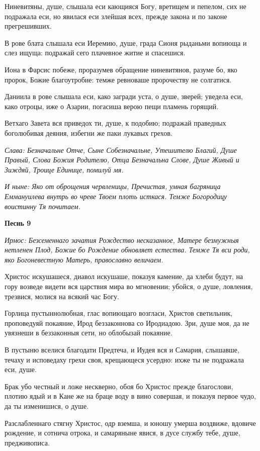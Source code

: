 Ниневитяны, душе, слышала еси кающияся Богу, вретищем и пепелом, сих не подражала еси, но явилася еси злейшая всех, прежде закона и по законе прегрешивших. 

В рове блата слышала еси Иеремию, душе, града Сионя рыданьми вопиюща и слез ищуща: подражай сего плачевное житие и спасешися. 

Иона в Фарсис побеже, проразумев обращение ниневитянов, разуме бо, яко пророк, Божие благоутробие: темже ревноваше пророчеству не солгатися. 

Даниила в рове слышала еси, како загради уста, о душе, зверей; уведела еси, како отроцы, иже о Азарии, погасиша верою пещи пламень горящий. 

Ветхаго Завета вся приведох ти, душе, к подобию; подражай праведных боголюбивая деяния, избегни же паки лукавых грехов. 

\itshape Слава\normalfont{}: Безначальне Отче, Сыне Собезначальне, Утешителю Благий, Душе Правый, Слова Божия Родителю, Отца Безначальна Слове, Душе Живый и Зиждяй, Троице Единице, помилуй мя. 

\itshape И ныне\normalfont{}: Яко от оброщения червленицы, Пречистая, умная багряница Еммануилева внутрь во чреве Твоем плоть исткася. Темже Богородицу воистинну Тя почитаем. 

\medskip\bfseries Песнь 9\normalfont{}

\itshape Ирмос\normalfont{}: Безсеменнаго зачатия Рождество несказанное, Матере безмужныя нетленен Плод, Божие бо Рождение обновляет естества. Темже Тя вси роди, яко Богоневестную Матерь, православно величаем. 

Христос искушашеся, диавол искушаше, показуя камение, да хлеби будут, на гору возведе видети вся царствия мира во мгновении; убойся, о душе, ловления, трезвися, молися на всякий час Богу. 

Горлица пустыннолюбная, глас вопиющаго возгласи, Христов светильник, проповедуяй покаяние, Ирод беззаконнова со Иродиадою. Зри, душе моя, да не увязнеши в беззаконныя сети, но облобызай покаяние. 

В пустыню вселися благодати Предтеча, и Иудея вся и Самария, слышавше, течаху и исповедаху грехи своя, крещающеся усердно: ихже ты не подражала еси, душе. 

Брак убо честный и ложе нескверно, обоя бо Христос прежде благослови, плотию ядый и в Кане же на браце воду в вино совершая, и показуя первое чудо, да ты изменишися, о душе. 

Разслабленнаго стягну Христос, одр вземша, и юношу умерша воздвиже, вдовиче рождение, и сотнича отрока, и самаряныне явися, в дусе службу тебе, душе, предживописа. 

